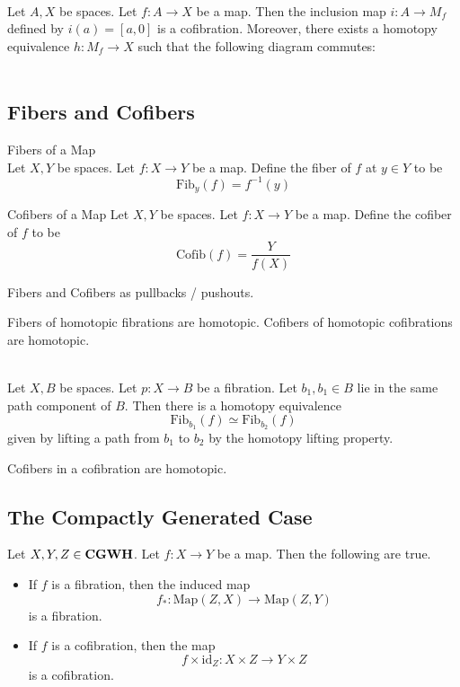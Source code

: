 \documentclass[a4paper]{article}
\begin{document}
\begin{prp}{}{}\\
Let $A,X$ be spaces. Let $f:A\to X$ be a map. Then the inclusion map $i:A\to M_f$ defined by $i(a)=[a,0]$ is a cofibration. Moreover, there exists a homotopy equivalence $h:M_f\to X$ such that the following diagram commutes: \\~\\
\end{prp}

\subsection{Fibers and Cofibers}
\begin{defn}{Fibers of a Map}{}\\
Let $X,Y$ be spaces. Let $f:X\to Y$ be a map. Define the fiber of $f$ at $y\in Y$ to be $$\text{Fib}_y(f)=f^{-1}(y)$$
\end{defn}

\begin{defn}{Cofibers of a Map}{} Let $X,Y$ be spaces. Let $f:X\to Y$ be a map. Define the cofiber of $f$ to be $$\text{Cofib}(f)=\frac{Y}{f(X)}$$
\end{defn}

Fibers and Cofibers as pullbacks / pushouts. 

Fibers of homotopic fibrations are homotopic. 
Cofibers of homotopic cofibrations are homotopic. 

\begin{prp}{}{}\\
Let $X,B$ be spaces. Let $p:X\to B$ be a fibration. Let $b_1,b_1\in B$ lie in the same path component of $B$. Then there is a homotopy equivalence $$\text{Fib}_{b_1}(f)\simeq\text{Fib}_{b_2}(f)$$ given by lifting a path from $b_1$ to $b_2$ by the homotopy lifting property. 
\end{prp}

Cofibers in a cofibration are homotopic. 

\subsection{The Compactly Generated Case}
\begin{prp}{}{} Let $X,Y,Z\in\bold{CGWH}$. Let $f:X\to Y$ be a map. Then the following are true. 
\begin{itemize}
\item If $f$ is a fibration, then the induced map $$f_\ast:\text{Map}(Z,X)\to\text{Map}(Z,Y)$$ is a fibration. 
\item If $f$ is a cofibration, then the map $$f\times\text{id}_Z:X\times Z\to Y\times Z$$ is a cofibration. 
\end{itemize}
\end{prp}
\end{document}
